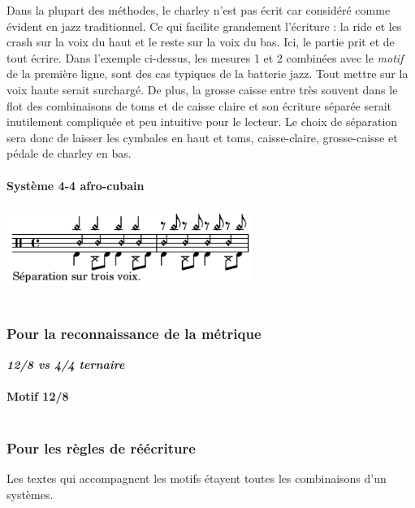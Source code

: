 Dans la plupart des méthodes, le charley n’est pas écrit car considéré comme évident en jazz traditionnel. Ce qui facilite grandement l’écriture : la ride et les crash sur la voix du haut et le reste sur la voix du bas. Ici, le partie prit et de tout écrire. Dans l’exemple ci-dessus, les mesures 1 et 2 combinées avec le \textit{motif} de la première ligne, sont des cas typiques de la batterie jazz. Tout mettre sur la voix haute serait surchargé. De plus, la grosse caisse entre très souvent dans le flot des combinaisons de toms et de caisse claire et son écriture séparée serait inutilement compliquée et peu intuitive pour le lecteur. Le choix de séparation sera donc de laisser les cymbales en haut et toms, caisse-claire, grosse-caisse et pédale de charley en bas.\\\\

\textbf{Système 4-4 afro-cubain}\\\\
\includegraphics[height=25mm, width=80mm]{z_images/1_description_notation/separation/3_separation_afro-cubain.png}\\\\

\subsubsection{Pour la reconnaissance de la métrique}
\textit{\textbf{12/8 vs 4/4 ternaire}}\\\\
\textbf{Motif 12/8}\\\\

\subsubsection{Pour les règles de réécriture}
Les textes qui accompagnent les motifs étayent toutes les combinaisons d’un systèmes. 
\newpage

